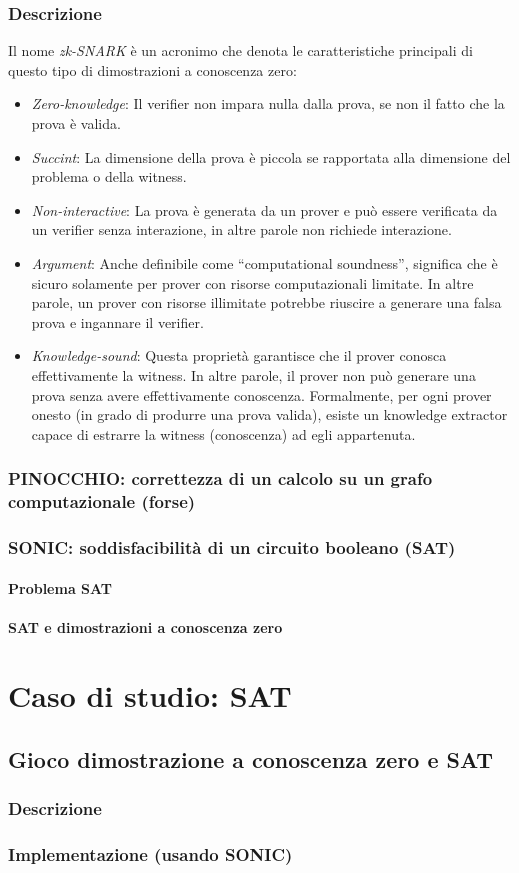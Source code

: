 \documentclass{article}
\theoremstyle{definition}
\begin{document}
\subsubsection{Descrizione}
Il nome \emph{zk-SNARK} è un acronimo che denota le caratteristiche principali di questo tipo di dimostrazioni a conoscenza zero:
\begin{itemize}
    \item \emph{Zero-knowledge}: Il verifier non impara nulla dalla prova, se non il fatto che la prova è valida.
    \item \emph{Succint}: La dimensione della prova è piccola se rapportata alla dimensione del problema o della witness.
    \item \emph{Non-interactive}: La prova è generata da un prover e può essere verificata da un verifier senza interazione, in altre parole non richiede interazione.
    \item \emph{Argument}: Anche definibile come ``computational soundness'', significa che è sicuro solamente per prover con risorse computazionali limitate. In altre parole, un prover con risorse illimitate potrebbe riuscire a generare una falsa prova e ingannare il verifier.
    \item \emph{Knowledge-sound}: Questa proprietà garantisce che il prover conosca effettivamente la witness. In altre parole, il prover non può generare una prova senza avere effettivamente conoscenza. Formalmente, per ogni prover onesto (in grado di produrre una prova valida), esiste un knowledge extractor capace di estrarre la witness (conoscenza) ad egli appartenuta.
\end{itemize}


\subsubsection{PINOCCHIO: correttezza di un calcolo su un grafo computazionale (forse)}
\subsubsection{SONIC: soddisfacibilità di un circuito booleano (SAT)}
\paragraph{Problema SAT}
\paragraph{SAT e dimostrazioni a conoscenza zero}

\section{Caso di studio: SAT}
\subsection{Gioco dimostrazione a conoscenza zero e SAT}
\subsubsection{Descrizione}
\subsubsection{Implementazione (usando SONIC)}



\clearpage


\nocite{*} %
\printbibliography
\end{document}

